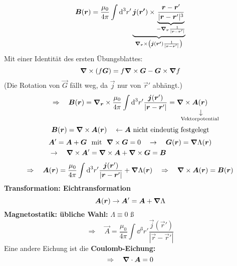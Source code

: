 \begin{equation*}
\bm{B}(\bm{r}) = \frac{\mu_0}{4 \pi} \int \textrm{d}^3 r' \underbrace{\bm{j}(\bm{r'}) \times \underbrace{\frac{\bm{r} - \bm{r}'}{|\bm{r} - \bm{r}'|^3}}_{- \bm{\nabla}_{\bm{r}} \frac{1}{|\bm{r} - \bm{r}'|}}}_{\bm{\nabla}_{\bm{r}} \times \left(\bm{j}(\bm{r'}) \frac{1}{|\bm{r} - \bm{r}'|}\right)}
\end{equation*}
Mit einer Identität des ersten Übungsblattes:
\begin{equation*}
\bm{\nabla} \times (f \bm{G}) = f \bm{\nabla} \times \bm{G} - \bm{G} \times \bm{\nabla} f
\end{equation*}
(Die Rotation von $ \vec{G} $ fällt weg, da $ \vec{j} $ nur von $ \vec{r}' $ abhängt.)
\begin{equation*}
\Rightarrow \quad \vec{B}(\vec{r}) = \vabla_{\vec{r}} \times \frac{\mu_0}{4 \pi} \int \dd^3 r'\frac{\vec{j}(\vec{r}')}{|\vec{r} - \vec{r}'|} = \vabla \times \custo{\rightarrow}{\vec{A}(\vec{r})}{\mathclap{\tx{Vektorpotential}}}
\end{equation*}
\begin{equation*}
\bm{B}(\bm{r}) = \bm{\nabla} \times \bm{A}(\bm{r}) \quad \leftarrow \bm{A} \textrm{ nicht eindeutig festgelegt}
\end{equation*}
\begin{align*}
& \bm{A}' = \bm{A} + \bm{G} \ \textrm{ mit } \ \bm{\nabla} \times \bm{G} = 0 \quad \rightarrow \quad \bm{G}(\bm{r}) = \bm{\nabla} \Lambda (\bm{r})\\
& \rightarrow \quad \bm{\nabla} \times \bm{A}' = \bm{\nabla} \times \bm{A} + \bm{\nabla} \times \bm{G} = \bm{B}
\end{align*}
\begin{equation*}
\Rightarrow \quad \bm{A}(\bm{r}) = \frac{\mu_0}{4 \pi} \int \textrm{d}^3 r' \frac{\bm{j}(\bm{r}')}{|\bm{r} - \bm{r}'|} + \bm{\nabla} \Lambda (\bm{r}) \quad \Rightarrow \quad \bm{\nabla} \times \bm{A}(\bm{r}) = \bm{B}(\bm{r})
\end{equation*}
\textbf{Transformation: Eichtransformation}
\begin{equation*}
\bm{A}(\bm{r}) \rightarrow \bm{A}' = \bm{A} + \bm{\nabla} \Lambda
\end{equation*}
\textbf{Magnetostatik: übliche Wahl:} $ \Lambda \equiv 0 $
ß\begin{equation*}
\Rightarrow \quad \vec{A} = \frac{\mu_0}{4 \pi} \int \dd ^3 r' \frac{\vec{j}(\vec{r}')}{|\vec{r} - \vec{r}'|}
\end{equation*}
Eine andere Eichung ist die \textbf{Coulomb-Eichung:}
\begin{equation*}
\Rightarrow \quad \bm{\nabla} \cdot \bm{A} = 0
\end{equation*}

